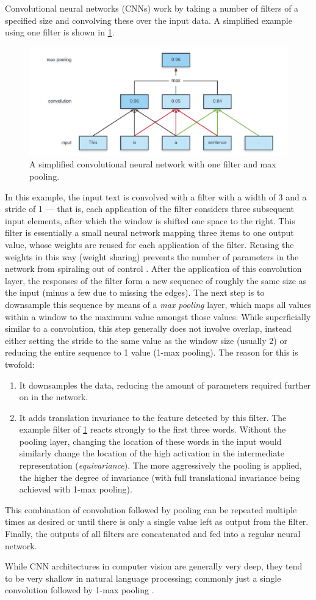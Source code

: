 Convolutional neural networks (CNNs) work by taking a number of filters  of a
specified size and convolving these over the input data. A simplified example
using one filter is shown in \cref{fig:cnn}.
\begin{figure}[tb]
  \centering
  \includegraphics[width=\textwidth]{figures/cnn.pdf}
  \caption{A simplified convolutional neural network with one filter and
  max pooling.\label{fig:cnn}}
\end{figure}
In this example, the input text is convolved with a filter with a width of 3 and
a stride of 1 --- that is, each application of the filter considers three
subsequent input elements, after which the window is shifted one space to the
right. This filter is essentially a small neural network mapping three items to
one output value, whose weights are reused for each application of the filter.
Reusing the weights in this way (weight sharing) prevents the number of
parameters in the network from spiraling out of control
\citep{lecun1995convolutional}. After the application of this convolution layer,
the responses of the filter form a new sequence of roughly the same size as the
input (minus a few due to missing the edges). The next step is to downsample
this sequence by means of a \emph{max pooling} layer, which maps all values
within a window to the maximum value amongst those values. While superficially
similar to a convolution, this step generally does not involve overlap, instead
either setting the stride to the same value as the window size (usually 2) or
reducing the entire sequence to 1 value (1-max pooling). The reason for this is
twofold:
\begin{enumerate}
\item It downsamples the data, reducing the amount of parameters
  required further on in the network.
\item It adds translation invariance to the feature detected by this filter.
  The example filter of \cref{fig:cnn} reacts strongly to the first three
  words. Without the pooling layer, changing the location of these words in
  the input would similarly change the location of the high activation in the
  intermediate representation (\emph{equivariance}). The more aggressively
  the pooling is applied, the higher the degree of invariance (with full
  translational invariance being achieved with 1-max pooling).
\end{enumerate}
This combination of convolution followed by pooling can be repeated multiple
times as desired or until there is only a single value left as output from the
filter. Finally, the outputs of all filters are concatenated and fed into a
regular neural network.

While CNN architectures in computer vision are generally very deep, they tend to
be very shallow in natural language processing; commonly just a single
convolution followed by 1-max pooling \citep{zhang2015conv}.

